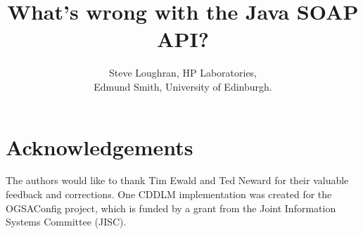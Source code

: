 \documentclass[a4]{article}
\begin{document}




\title{What's wrong with the Java SOAP API?}
\author{
    Steve Loughran, HP Laboratories,\\
    Edmund Smith, University of Edinburgh. 
    }
\maketitle









\section{Acknowledgements}

The authors would like to thank Tim Ewald and Ted Neward for their
valuable feedback and corrections. One CDDLM implementation was
created for the OGSAConfig project, which is funded by a grant from
the Joint Information Systems Committee (JISC).


\onecolumn

%


\end{document}
